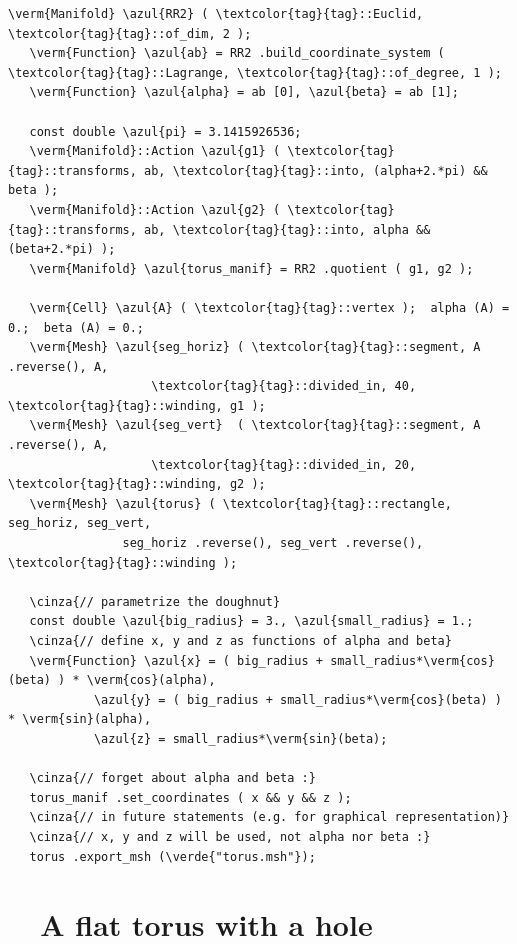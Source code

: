 \begin{Verbatim}[commandchars=\\\{\},formatcom=\small\tt,frame=single,
   label=parag-\ref{\numb section 7.\numb parag 5}.cpp,rulecolor=\color{coment},
   baselinestretch=0.94,framesep=2mm                                            ]
   \verm{Manifold} \azul{RR2} ( \textcolor{tag}{tag}::Euclid, \textcolor{tag}{tag}::of_dim, 2 );
   \verm{Function} \azul{ab} = RR2 .build_coordinate_system ( \textcolor{tag}{tag}::Lagrange, \textcolor{tag}{tag}::of_degree, 1 );
   \verm{Function} \azul{alpha} = ab [0], \azul{beta} = ab [1];

   const double \azul{pi} = 3.1415926536;
   \verm{Manifold}::Action \azul{g1} ( \textcolor{tag}{tag}::transforms, ab, \textcolor{tag}{tag}::into, (alpha+2.*pi) && beta );
   \verm{Manifold}::Action \azul{g2} ( \textcolor{tag}{tag}::transforms, ab, \textcolor{tag}{tag}::into, alpha && (beta+2.*pi) );
   \verm{Manifold} \azul{torus_manif} = RR2 .quotient ( g1, g2 );

   \verm{Cell} \azul{A} ( \textcolor{tag}{tag}::vertex );  alpha (A) = 0.;  beta (A) = 0.;
   \verm{Mesh} \azul{seg_horiz} ( \textcolor{tag}{tag}::segment, A .reverse(), A,
                    \textcolor{tag}{tag}::divided_in, 40, \textcolor{tag}{tag}::winding, g1 );
   \verm{Mesh} \azul{seg_vert}  ( \textcolor{tag}{tag}::segment, A .reverse(), A,
                    \textcolor{tag}{tag}::divided_in, 20, \textcolor{tag}{tag}::winding, g2 );
   \verm{Mesh} \azul{torus} ( \textcolor{tag}{tag}::rectangle, seg_horiz, seg_vert,
                seg_horiz .reverse(), seg_vert .reverse(), \textcolor{tag}{tag}::winding );

   \cinza{// parametrize the doughnut}
   const double \azul{big_radius} = 3., \azul{small_radius} = 1.;
   \cinza{// define x, y and z as functions of alpha and beta}
   \verm{Function} \azul{x} = ( big_radius + small_radius*\verm{cos}(beta) ) * \verm{cos}(alpha),
            \azul{y} = ( big_radius + small_radius*\verm{cos}(beta) ) * \verm{sin}(alpha),
            \azul{z} = small_radius*\verm{sin}(beta);

   \cinza{// forget about alpha and beta :}
   torus_manif .set_coordinates ( x && y && z );
   \cinza{// in future statements (e.g. for graphical representation)}
   \cinza{// x, y and z will be used, not alpha nor beta :}
   torus .export_msh (\verde{"torus.msh"});
\end{Verbatim}


\section{~~A flat torus with a hole}\label{\numb section 7.\numb parag 6}

